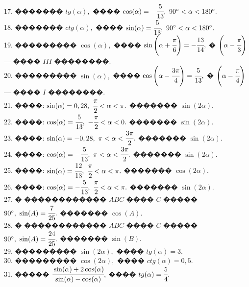 \documentclass[12pt]{article}
\begin{document}
17. ������� $tg(\alpha),$ ���� $\cos(\alpha)=-\cfrac{5}{13},\ 90^\circ<\alpha<180^\circ.$\\
18. ������� $ctg(\alpha),$ ���� $\sin(\alpha)=\cfrac{5}{13},\ 90^\circ<\alpha<180^\circ.$\\
19. ��������� $\cos(\alpha),$ ���� $\sin\left(\alpha+\cfrac{\pi}{6}\right)=-\cfrac{13}{14},$ � $\left(\alpha-\cfrac{\pi}{3}\right)$ --- ���� $III$ ��������.\\
20. ��������� $\sin(\alpha),$ ���� $\cos\left(\alpha-\cfrac{3\pi}{4}\right)=\cfrac{5}{13},$ � $\left(\alpha-\cfrac{\pi}{4}\right)$ --- ���� $I$ ��������.\\
21. ����: $\sin(\alpha)=0,28,\ \cfrac{\pi}{2}<\alpha<\pi.$ ������� $\sin(2\alpha).$\\
22. ����: $\cos(\alpha)=\cfrac{5}{13},\ -\cfrac{\pi}{2}<\alpha<0.$ ������� $\sin(2\alpha).$\\
23. ����: $\sin(\alpha)=-0,28,\ \pi<\alpha<\cfrac{3\pi}{2}.$ ������� $\sin(2\alpha).$\\
24. ����: $\cos(\alpha)=-\cfrac{5}{13},\ \pi<\alpha<\cfrac{3\pi}{2}.$ ������� $\sin(2\alpha).$\\
25. ����: $\sin(\alpha)=\cfrac{12}{13},\ \cfrac{\pi}{2}<\alpha<\pi.$ ������� $\cos(2\alpha).$\\
26. ����: $\cos(\alpha)=-\cfrac{5}{13},\ \cfrac{\pi}{2}<\alpha<\pi.$ ������� $\sin(2\alpha).$\\
27. � ������������ $ABC$ ���� $C$ ����� $90^\circ,\ \sin(A)=\cfrac{7}{25}.$ ������� $\cos(A).$\\
28. � ������������ $ABC$ ���� $C$ ����� $90^\circ,\ \sin(A)=\cfrac{24}{25}.$ ������� $\sin(B).$\\
29. ��������� $\sin(2\alpha),$ ���� $tg(\alpha)=3.$\\
30. ��������� $\cos(2\alpha),$ ���� $ctg(\alpha)=0,5.$\\
31. ����� $\cfrac{\sin(\alpha)+2\cos(\alpha)}{\sin(\alpha)-\cos(\alpha)},$ ���� $tg(\alpha)=\cfrac{5}{4}.$
\newpage
\end{document}
